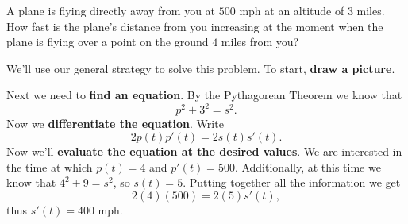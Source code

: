 \documentclass{ximera}
\begin{document}
\begin{example}
\label{exam:receding airplane}
A plane is flying directly away from you at $500$ mph at an altitude of
$3$ miles.  How fast is the plane's distance from you increasing at the
moment when the plane is flying over a point on the ground $4$ miles
from you?


\begin{explanation}
We'll use our general strategy to solve this problem. To start,
\textbf{draw a picture}.
\begin{image}
\end{image}
Next we need to \textbf{find an equation}. By the Pythagorean Theorem
we know that
\[
p^2+3^2=s^2.
\] 
Now we \textbf{differentiate the equation}. Write
\[
2p(t)p'(t)  = 2s(t) s'(t).
\] 
Now we'll \textbf{evaluate the equation at the desired values}.  We
are interested in the time at which $p(t)=4$ and $p'(t) =
500$. Additionally, at this time we know that $4^2+9=s^2$, so
$s(t)=5$.  Putting together all the information we get
\[
2(4)(500)=2(5)s'(t),
\]
thus $s'(t)=400$ mph.
\end{explanation}
\end{example}
\end{document}
